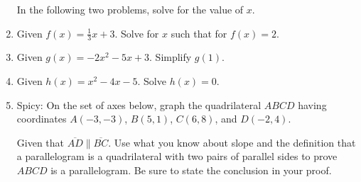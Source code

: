 \documentclass[12pt, twoside]{article}
\begin{document}
\begin{enumerate}
  In the following two problems, solve for the value of $x$.

\vspace{3cm}

  \item Given $f(x)=\frac{1}{3} x+3$. Solve for $x$ such that for $f(x)=2$. \vspace{3.5cm}
  \item Given $g(x)=-2x^2-5x+3$. Simplify $g(1)$. \vspace{2cm}
  \item Given $h(x)=x^2-4x-5$. Solve $h(x)=0$. \vspace{3cm}

  \newpage

  \item Spicy: On the set of axes below, graph the quadrilateral $ABCD$ having coordinates $A(-3,-3)$, $B(5,1)$, $C(6,8)$, and $D(-2,4)$.
    \begin{center} %
    \end{center}
    Given that $\overline{AD} \parallel \overline{BC}$. Use what you know about slope and the definition that a parallelogram is a quadrilateral with two pairs of parallel sides to prove $ABCD$ is a parallelogram. Be sure to state the conclusion in your proof.



  \end{enumerate}

  
\end{document}
